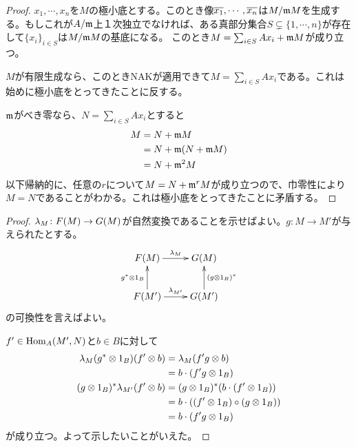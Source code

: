 \begin{proof}
$x_1, \cdots , x_n$を$M$の極小底とする。このとき像$\overline{x_1}, \cdots, \overline{x_n}$は$M/\mathfrak{m} M$を生成する。もしこれが$A/\mathfrak{m}$上１次独立でなければ、ある真部分集合$S \subsetneq \{ 1, \cdots , n \}$が存在して$\{ x_i \}_{i \in S}$は$M/\mathfrak{m} M$の基底になる。
このとき$M = \sum_{i \in S} Ax_i + \mathfrak{m} M$が成り立つ。

$M$が有限生成なら、このときNAKが適用できて$M = \sum_{i \in S} Ax_i$である。これは始めに極小底をとってきたことに反する。

$\mathfrak{m}$がべき零なら、$N =  \sum_{i \in S} A x_i$とすると
\begin{align*}
  M &= N + \mathfrak{m} M \\
  &= N + \mathfrak{m} ( N + \mathfrak{m} M) \\
  &= N + \mathfrak{m}^2 M
\end{align*}
以下帰納的に、任意の$r$について$M = N + \mathfrak{m}^r M$が成り立つので、巾零性により$M = N$であることがわかる。これは極小底をとってきたことに矛盾する。
\end{proof}


\begin{proof}
  ${\lambda}_M \colon F(M) \to G(M)$が自然変換であることを示せばよい。$g \colon M \to M'$が与えられたとする。
  \[
  \xymatrix{
  F(M) \ar[r]^{\grl_M} & G(M) \\
  F(M') \ar[u]^{g^* \ts 1_B} \ar[r]^{\grl_{M'}} & G(M') \ar[u]_{(g \ts 1_B)^*}
  }
  \]
  の可換性を言えばよい。

  $f' \in \operatorname{Hom}_A(M',N)$と$b \in B$に対して
  \begin{align*}
    {\lambda}_M (g^* \otimes 1_B) (f' \otimes b) &= {\lambda}_M (f' g \otimes b) \\
    &= b \cdot (f'g \otimes 1_B) \\
    (g \otimes 1_B)^* {\lambda}_{M'} (f' \otimes b) &= (g \otimes 1_B)^* (b \cdot (f' \otimes 1_B)) \\
    &= b \cdot ((f' \otimes 1_B) \circ (g \otimes 1_B) ) \\
    &= b \cdot (f'g \otimes 1_B)
  \end{align*}
  が成り立つ。よって示したいことがいえた。
\end{proof}




